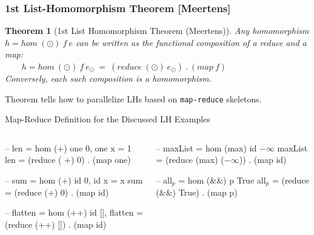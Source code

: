 \documentclass{beamer}
\renewcommand{\emph}[1]{\textcolor{structure}{#1}}
\newcommand{\emp}[1]{\textcolor{DikuRed}{ #1}}
\newcommand{\mymath}[1]{$ #1 $}
\newcommand{\myindx}[1]{_{#1}}
\newtheorem{mytheo}{Theorem}
\begin{document}
\begin{frame}[fragile,t]
  \frametitle{1st List-Homomorphism Theorem [Meertens]}

\begin{mytheo}[1st List Homomorphism Theorem (Meertens)]\label{LHomTh1}
Any homomorphism \emp{$h = hom \ (\odot) \ f \ e$} can be written 
as the functional composition of a reduce and a map: \\
\emp{$\ \ \ \ \ \ \ \ \ h = hom \ (\odot) \ f \ e_{\odot} \ = \ (reduce \ (\odot) \ e_{\odot}) \ . \ (map \ f)$} \\
Conversely, each such composition is a homomorphism. \\
\end{mytheo}

\bigskip

Theorem tells how to parallelize LHs based on {\tt map-reduce} skeletons.

\bigskip

\begin{block}{Map-Reduce Definition for the Discussed LH Examples} \vspace{-1.5 ex}
\begin{columns}
\begin{colorcode}[fontsize=\scriptsize]
-- len = hom \emp{(+)} \emph{one} \emp{0}, one x = 1
len = \emp{(reduce (\emp{+}) 0)} . \emph{(map one)}

-- sum = hom \emp{(+)} \emph{id} \emp{0}, id x = x
sum = \emp{(reduce (+) 0)} . \emph{(map id)}

-- flatten = hom \emp{(++)} \emph{id} \emp{[]},
flatten = \emp{(reduce (++) [])} . \emph{(map id)}
\end{colorcode}
\begin{colorcode}[fontsize=\scriptsize]
-- maxList = hom \emp{(max)} \emph{id} \emp{\mymath{-\infty}}
maxList = \emp{(reduce (max) (\mymath{-\infty})}) . 
          \emph{(map id)}

-- all\mymath{\myindx{p}} = hom \emp{(&&)} \emph{p} \emp{True}
all\mymath{\myindx{p}} = \emp{(reduce (&&) True)} . 
       \emph{(map p)}

\end{colorcode}
\end{columns}
\end{block}

\end{frame}
\end{document}
